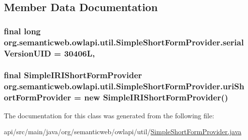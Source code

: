 \subsection{Member Data Documentation}
\hypertarget{classorg_1_1semanticweb_1_1owlapi_1_1util_1_1_simple_short_form_provider_afdc67449aa074db9df977fd0c2941ef5}{
\subsubsection[{serial\-Version\-U\-I\-D}]{\setlength{\rightskip}{0pt plus 5cm}final long org.\-semanticweb.\-owlapi.\-util.\-Simple\-Short\-Form\-Provider.\-serial\-Version\-U\-I\-D = 30406\-L\hspace{0.3cm}{\ttfamily [static]}, {\ttfamily [private]}}}\label{classorg_1_1semanticweb_1_1owlapi_1_1util_1_1_simple_short_form_provider_afdc67449aa074db9df977fd0c2941ef5}
\hypertarget{classorg_1_1semanticweb_1_1owlapi_1_1util_1_1_simple_short_form_provider_a54ac06dd611546fb5a53d6bab07267bd}{
\subsubsection[{uri\-Short\-Form\-Provider}]{\setlength{\rightskip}{0pt plus 5cm}final {\bf Simple\-I\-R\-I\-Short\-Form\-Provider} org.\-semanticweb.\-owlapi.\-util.\-Simple\-Short\-Form\-Provider.\-uri\-Short\-Form\-Provider = new {\bf Simple\-I\-R\-I\-Short\-Form\-Provider}()\hspace{0.3cm}{\ttfamily [private]}}}\label{classorg_1_1semanticweb_1_1owlapi_1_1util_1_1_simple_short_form_provider_a54ac06dd611546fb5a53d6bab07267bd}


The documentation for this class was generated from the following file\-:\begin{DoxyCompactItemize}
\item 
api/src/main/java/org/semanticweb/owlapi/util/\hyperlink{_simple_short_form_provider_8java}{Simple\-Short\-Form\-Provider.\-java}\end{DoxyCompactItemize}
